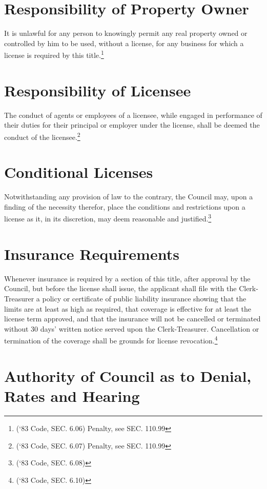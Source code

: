 \section{Responsibility of Property Owner}
It is unlawful for any person to knowingly permit any real property owned or controlled by him to be used, without a license, for any business for which a license is required by this title.\footnote{(‘83 Code, SEC. 6.06)  Penalty, see SEC. 110.99}

\section{Responsibility of Licensee}
The conduct of agents or employees of a licensee, while engaged in performance of their duties for their principal or employer under the license, shall be deemed the conduct of the licensee.\footnote{(‘83 Code, SEC. 6.07)  Penalty, see SEC. 110.99}

\section{Conditional Licenses}
Notwithstanding any provision of law to the contrary, the Council may, upon a finding of the necessity therefor, place the conditions and restrictions upon a license as it, in its discretion, may deem reasonable and justified.\footnote{(‘83 Code, SEC. 6.08)}

\section{Insurance Requirements}
Whenever insurance is required by a section of this title, after approval by the Council, but before the license shall issue, the applicant shall file with the Clerk-Treasurer a policy or certificate of public liability insurance showing that the limits are at least as high as required, that coverage is effective for at least the license term approved, and that the insurance will not be cancelled or terminated without 30 days’ written notice served upon the Clerk-Treasurer.  Cancellation or termination of the coverage shall be grounds for license revocation.\footnote{(‘83 Code, SEC. 6.10)}

\section{Authority of Council as to Denial, Rates and Hearing}
